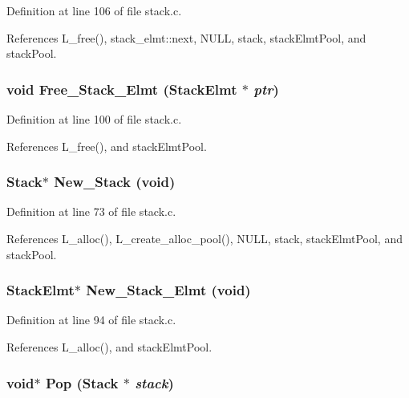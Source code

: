 Definition at line 106 of file stack.c.

References L\_\-free(), stack\_\-elmt::next, NULL, stack, stack\-Elmt\-Pool, and stack\-Pool.
\subsubsection{\setlength{\rightskip}{0pt plus 5cm}void Free\_\-Stack\_\-Elmt (\bf{Stack\-Elmt} $\ast$ {\em ptr})}\label{stack_8c_1a1138d66f29f2c5d0ae49fc95355104}




Definition at line 100 of file stack.c.

References L\_\-free(), and stack\-Elmt\-Pool.
\subsubsection{\setlength{\rightskip}{0pt plus 5cm}\bf{Stack}$\ast$ New\_\-Stack (void)}\label{stack_8c_2a25d0256b96282a3446a9f24e83e07d}




Definition at line 73 of file stack.c.

References L\_\-alloc(), L\_\-create\_\-alloc\_\-pool(), NULL, stack, stack\-Elmt\-Pool, and stack\-Pool.
\subsubsection{\setlength{\rightskip}{0pt plus 5cm}\bf{Stack\-Elmt}$\ast$ New\_\-Stack\_\-Elmt (void)}\label{stack_8c_d89e20eb985b29959a68376e1a7b5402}




Definition at line 94 of file stack.c.

References L\_\-alloc(), and stack\-Elmt\-Pool.
\subsubsection{\setlength{\rightskip}{0pt plus 5cm}void$\ast$ Pop (\bf{Stack} $\ast$ {\em stack})}\label{stack_8c_0b3eb53f063ddc4efb6e755860960cf5}




